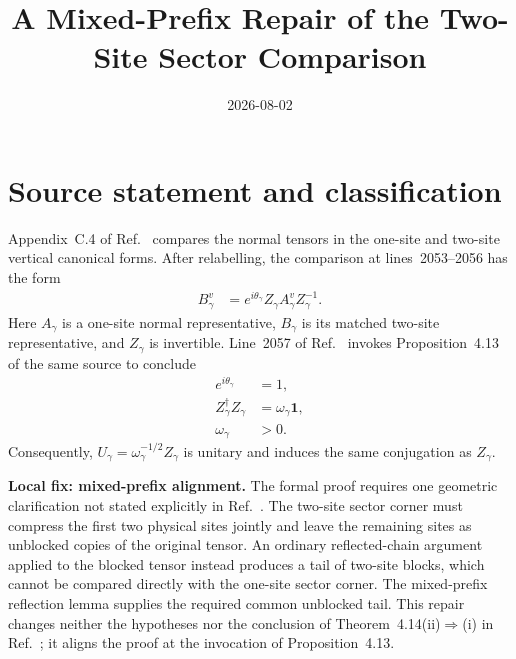 \documentclass{article}
\title{A Mixed-Prefix Repair of the Two-Site Sector Comparison}
\author{}
\date{2026-08-02}
\begin{document}
\maketitle
{}

\section{Source statement and classification}

Appendix~C.4 of Ref.~\cite{Cirac2016MPDO_arXiv} compares the normal tensors in
the one-site and two-site vertical canonical forms. After relabelling, the
comparison at lines~2053--2056 has the form
\begin{align}
    B_\gamma^v
    &=e^{i\theta_\gamma}Z_\gamma A_\gamma^vZ_\gamma^{-1}.
    \label{eq:cpsv16_two_site_sector_unitary_gauge_gap_gauge_phase}
\end{align}
Here $A_\gamma$ is a one-site normal representative, $B_\gamma$ is its
matched two-site representative, and $Z_\gamma$ is invertible. Line~2057 of
Ref.~\cite{Cirac2016MPDO_arXiv} invokes Proposition~4.13 of the same source to
conclude
\begin{align}
    e^{i\theta_\gamma}
    &=1,
    \label{eq:cpsv16_two_site_sector_unitary_gauge_gap_source_phase_removal}\\
    Z_\gamma^\dagger Z_\gamma
    &=\omega_\gamma\mathbf 1,
    \label{eq:cpsv16_two_site_sector_unitary_gauge_gap_source_metric_upgrade}\\
    \omega_\gamma
    &>0.
    \label{eq:cpsv16_two_site_sector_unitary_gauge_gap_source_metric_positivity}
\end{align}
Consequently, $U_\gamma=\omega_\gamma^{-1/2}Z_\gamma$ is unitary and induces
the same conjugation as $Z_\gamma$.

\textbf{Local fix: mixed-prefix alignment.}
The formal proof requires one geometric clarification not stated explicitly
in Ref.~\cite{Cirac2016MPDO_arXiv}. The two-site sector corner must compress
the first two physical sites jointly and leave the remaining sites as
unblocked copies of the original tensor. An ordinary reflected-chain argument
applied to the blocked tensor instead produces a tail of two-site blocks,
which cannot be compared directly with the one-site sector corner. The
mixed-prefix reflection lemma supplies the required common unblocked tail.
This repair changes neither the hypotheses nor the conclusion of
Theorem~4.14(ii)$\Rightarrow$(i) in Ref.~\cite{Cirac2016MPDO_arXiv}; it aligns
the proof at the invocation of Proposition~4.13.
\end{document}
